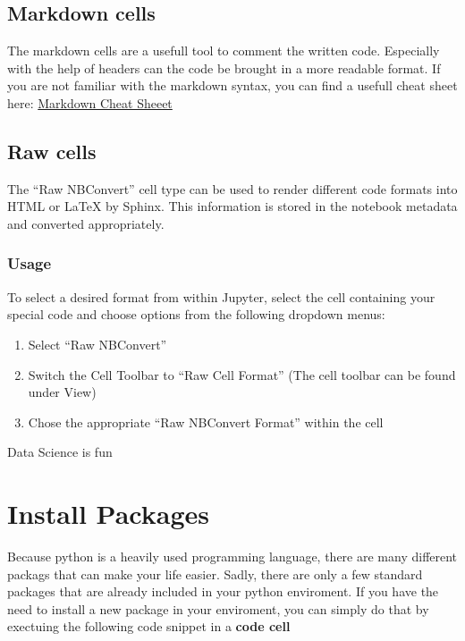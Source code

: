 \documentclass[
  letterpaper,
  DIV=11,
  numbers=noendperiod]{scrreprt}
\providecommand{\tightlist}{%
  \setlength{\itemsep}{0pt}\setlength{\parskip}{0pt}}\usepackage{longtable,booktabs,array}
\begin{document}
\subsection{Markdown cells}\label{markdown-cells}

The markdown cells are a usefull tool to comment the written code.
Especially with the help of headers can the code be brought in a more
readable format. If you are not familiar with the markdown syntax, you
can find a usefull cheat sheet here:
\href{https://www.ibm.com/docs/en/db2-event-store/2.0.0?topic=notebooks-markdown-jupyter-cheatsheet}{Markdown
Cheat Sheeet}

\subsection{Raw cells}\label{raw-cells}

The ``Raw NBConvert'' cell type can be used to render different code
formats into HTML or LaTeX by Sphinx. This information is stored in the
notebook metadata and converted appropriately.

\subsubsection{Usage}\label{usage}

To select a desired format from within Jupyter, select the cell
containing your special code and choose options from the following
dropdown menus:

\begin{enumerate}
\def\labelenumi{\arabic{enumi}.}
\tightlist
\item
  Select ``Raw NBConvert''
\item
  Switch the Cell Toolbar to ``Raw Cell Format'' (The cell toolbar can
  be found under View)
\item
  Chose the appropriate ``Raw NBConvert Format'' within the cell
\end{enumerate}

Data Science is fun

\section{Install Packages}\label{install-packages}

Because python is a heavily used programming language, there are many
different packags that can make your life easier. Sadly, there are only
a few standard packages that are already included in your python
enviroment. If you have the need to install a new package in your
enviroment, you can simply do that by exectuing the following code
snippet in a \textbf{code cell}
\end{document}
